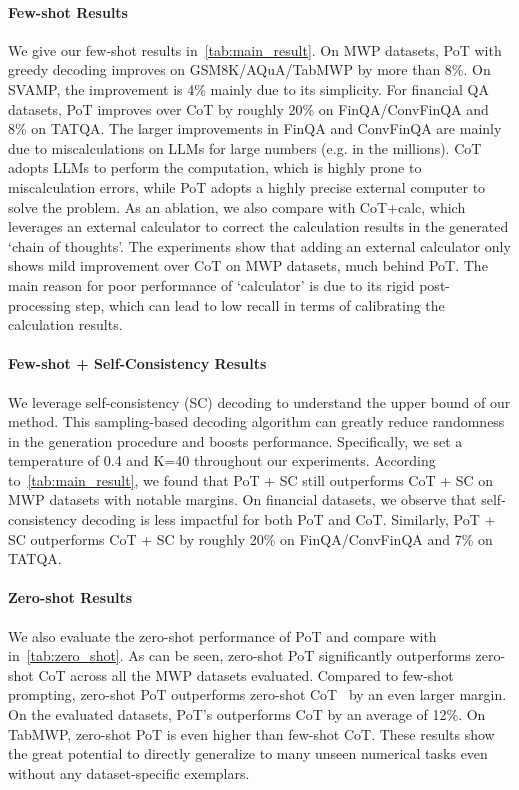 \paragraph{Few-shot Results} We give our few-shot results in~\autoref{tab:main_result}. On MWP datasets, PoT with greedy decoding improves on GSM8K/AQuA/TabMWP by more than 8\%. On SVAMP, the improvement is 4\% mainly due to its simplicity. For financial QA datasets, PoT improves over CoT by roughly 20\% on FinQA/ConvFinQA and 8\% on TATQA. The larger improvements in FinQA and ConvFinQA are mainly due to miscalculations on LLMs for large numbers (e.g. in the millions). CoT adopts LLMs to perform the computation, which is highly prone to miscalculation errors, while PoT adopts a highly precise external computer to solve the problem. As an ablation, we also compare with CoT+calc, which leverages an external calculator to correct the calculation results in the generated `chain of thoughts'. The experiments show that adding an external calculator only shows mild improvement over CoT on MWP datasets, much behind PoT. The main reason for poor performance of `calculator' is due to its rigid post-processing step, which can lead to low recall in terms of calibrating the calculation results.

\paragraph{Few-shot + Self-Consistency Results} We leverage self-consistency (SC) decoding to understand the upper bound of our method. This sampling-based decoding algorithm can greatly reduce randomness in the generation procedure and boosts performance. Specifically, we set a temperature of 0.4 and K=40 throughout our experiments. According to~\autoref{tab:main_result}, we found that PoT + SC still outperforms CoT + SC on MWP datasets with notable margins. On financial datasets, we observe that self-consistency decoding is less impactful for both PoT and CoT. Similarly, PoT + SC outperforms CoT + SC by roughly 20\% on FinQA/ConvFinQA and 7\% on TATQA. 

\paragraph{Zero-shot Results} We also evaluate the zero-shot performance of PoT and compare with~\cite{kojima2022large} in~\autoref{tab:zero_shot}. As can be seen, zero-shot PoT significantly outperforms zero-shot CoT across all the MWP datasets evaluated. Compared to few-shot prompting, zero-shot PoT outperforms zero-shot CoT~\citep{kojima2022large} by an even larger margin. On the evaluated datasets, PoT's outperforms CoT by an average of 12\%. On TabMWP, zero-shot PoT is even higher than few-shot CoT. These results show the great potential to directly generalize to many unseen numerical tasks even without any dataset-specific exemplars.

